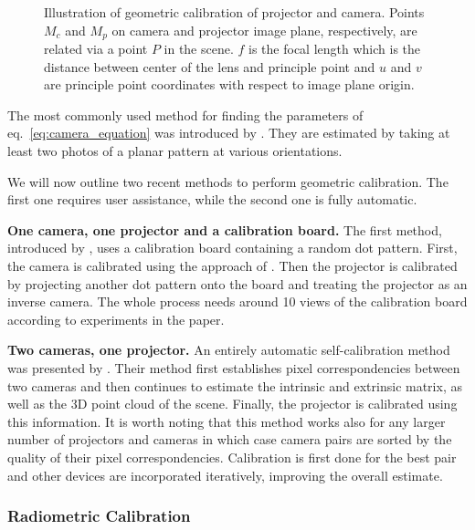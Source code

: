 \begin{figure}[ht]
    \centering
    \def\svgwidth{0.8\textwidth}
    
    \caption{Illustration of geometric calibration of projector and camera. Points \(M_c\) and \(M_p\) on camera and projector image plane, respectively, are related via a point \(P\) in the scene. \(f\) is the focal length which is the distance between center of the lens and principle point and \(u\) and \(v\) are principle point coordinates with respect to image plane origin.}
    \label{fig:background_camera_calibration}
\end{figure}

The most commonly used method for finding the parameters of eq.~\ref{eq:camera_equation} was introduced by \citet{Zhang1999}. They are estimated by taking at least two photos of a planar pattern at various orientations.

We will now outline two recent methods to perform geometric calibration. The first one requires user assistance, while the second one is fully automatic.

\textbf{One camera, one projector and a calibration board.} The first method, introduced by \citet{Yang2016}, uses a calibration board containing a random dot pattern. First, the camera is calibrated using the approach of \citet{Zhang1999}. Then the projector is calibrated by projecting another dot pattern onto the board and treating the projector as an inverse camera. The whole process needs around 10 views of the calibration board according to experiments in the paper.

\textbf{Two cameras, one projector.} An entirely automatic self-calibration method was presented by \citet{Willi2017}. Their method first establishes pixel correspondencies between two cameras and then continues to estimate the intrinsic and extrinsic matrix, as well as the 3D point cloud of the scene. Finally, the projector is calibrated using this information. It is worth noting that this method works also for any larger number of projectors and cameras in which case camera pairs are sorted by the quality of their pixel correspondencies. Calibration is first done for the best pair and other devices are incorporated iteratively, improving the overall estimate.

\subsubsection{Radiometric Calibration}
\label{section:background-projection_mapping-procams-radiometric_calibration}

